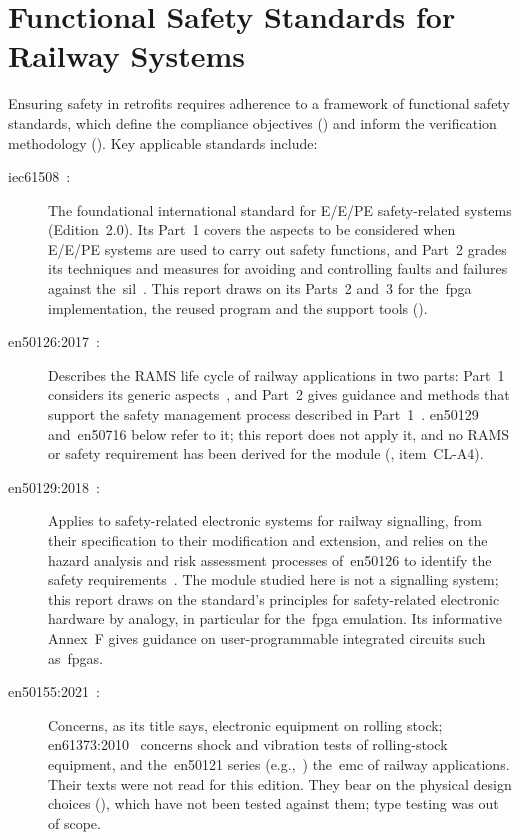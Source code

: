 \section{Functional Safety Standards for Railway Systems}
\label{sec:standards_detail}
Ensuring safety in retrofits requires adherence to a framework of functional safety standards, which define the compliance objectives () and inform the verification methodology (). Key applicable standards include:
\begin{description}
	\item[\gls{iec61508}~\cite{iec61508_2010}:] The foundational international standard for E/E/PE safety-related systems (Edition~2.0). Its Part~1 covers the aspects to be considered when E/E/PE systems are used to carry out safety functions, and Part~2 grades its techniques and measures for avoiding and controlling faults and failures against the~\gls{sil}~\cite{iec61508_2_2010}. This report draws on its Parts~2 and~3 for the~\gls{fpga} implementation, the reused program and the support tools ().
	\item[\gls{en50126}:2017~\cite{en50126_1_2017, en50126_2_2017}:] Describes the RAMS life cycle of railway applications in two parts: Part~1 considers its generic aspects~\cite{en50126_1_2017}, and Part~2 gives guidance and methods that support the safety management process described in Part~1~\cite{en50126_2_2017}. \gls{en50129} and~\gls{en50716} below refer to it; this report does not apply it, and no RAMS or safety requirement has been derived for the module (, item~CL-A4).
	\item[\gls{en50129}:2018~\cite{en50129_2018}:] Applies to safety-related electronic systems for railway signalling, from their specification to their modification and extension, and relies on the hazard analysis and risk assessment processes of~\gls{en50126} to identify the safety requirements~\cite{en50129_2018}. The module studied here is not a signalling system; this report draws on the standard's principles for safety-related electronic hardware by analogy, in particular for the~\gls{fpga} emulation. Its informative Annex~F gives guidance on user-programmable integrated circuits such as~\glspl{fpga}.
	\item[\gls{en50155}:2021~\cite{en50155_2021}:] Concerns, as its title says, electronic equipment on rolling stock; \gls{en61373}:2010~\cite{en61373_2010} concerns shock and vibration tests of rolling-stock equipment, and the~\gls{en50121} series (e.g.,~\cite{en50121_3_2_2016}) the~\gls{emc} of railway applications. Their texts were not read for this edition. They bear on the physical design choices (), which have not been tested against them; type testing was out of scope.

\end{description}
